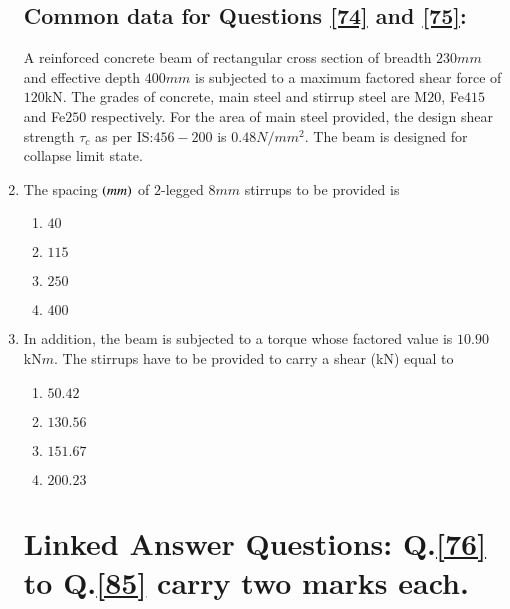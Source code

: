 \documentclass[journal]{IEEEtran}
\begin{document}
\begin{enumerate}
            \subsection*{Common data for Questions \ref{74} and \ref{75}:}
            A reinforced concrete beam of rectangular cross section of breadth $230 mm$ and effective depth $400 mm$ is subjected to a maximum factored shear force of $120 $kN. The grades of concrete, main steel and stirrup steel are M$20$, Fe$415$ and Fe$250$ respectively. For the area of main steel provided, the design shear strength $\tau_c$ as per IS:$456-200$ is $0.48 N/mm^2$. The beam is designed for collapse limit state.
            \item \label{74} The spacing $\left(mm\right)$ of $2$-legged $8 mm$ stirrups to be provided is
                \begin{enumerate}
                    \item $40$
                    \item $115$
                    \item $250$
                    \item $400$
                \end{enumerate}
            \item \label{75} In addition, the beam is subjected to a torque whose factored value is $10.90$ kN$m$. The stirrups have to be provided to carry a shear (kN) equal to
                \begin{enumerate}
                    \item $50.42$
                    \item $130.56$
                    \item $151.67$
                    \item $200.23$
                \end{enumerate}

    \section*{Linked Answer Questions: Q.\ref{76} to Q.\ref{85} carry two marks each.}

\end{enumerate}
\end{document}
